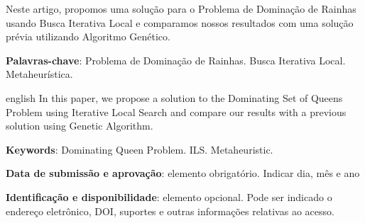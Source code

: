 \documentclass[
	article,			%
	11pt,				%
	oneside,			%
	a4paper,			%
	english,			%
	brazil,				%
	sumario=tradicional
	]{abntex2}
\begin{document}

\frenchspacing 


%
%

\maketitle





\begin{resumoumacoluna}
Neste artigo, propomos uma solução para o Problema de Dominação de Rainhas usando Busca Iterativa Local e comparamos nossos resultados com uma solução prévia utilizando Algoritmo Genético.
 
 \vspace{\onelineskip}
 
 \noindent
 \textbf{Palavras-chave}: Problema de Dominação de Rainhas. Busca Iterativa Local. Metaheurística.
\end{resumoumacoluna}


\renewcommand{\resumoname}{Abstract}
\begin{resumoumacoluna}
 \begin{otherlanguage*}{english}
  In this paper, we propose a solution to the Dominating Set of Queens Problem
  using Iterative Local Search and compare our results with a previous 
  solution using Genetic Algorithm.

   \vspace{\onelineskip}
 
   \noindent
   \textbf{Keywords}: Dominating Queen Problem. ILS. Metaheuristic.
 \end{otherlanguage*}  
\end{resumoumacoluna}


\begin{center}\smaller
\textbf{Data de submissão e aprovação}: elemento obrigatório. Indicar dia, mês e ano

\textbf{Identificação e disponibilidade}: elemento opcional. Pode ser indicado 
o endereço eletrônico, DOI, suportes e outras informações relativas ao acesso.
\end{center}
\end{document}
